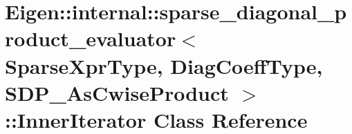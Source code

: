 \hypertarget{class_eigen_1_1internal_1_1sparse__diagonal__product__evaluator_3_01_sparse_xpr_type_00_01_diag_f44167c623880e382ac76ec71f78299c}{}\section{Eigen\+:\+:internal\+:\+:sparse\+\_\+diagonal\+\_\+product\+\_\+evaluator$<$ Sparse\+Xpr\+Type, Diag\+Coeff\+Type, S\+D\+P\+\_\+\+As\+Cwise\+Product $>$\+:\+:Inner\+Iterator Class Reference}
\label{class_eigen_1_1internal_1_1sparse__diagonal__product__evaluator_3_01_sparse_xpr_type_00_01_diag_f44167c623880e382ac76ec71f78299c}
